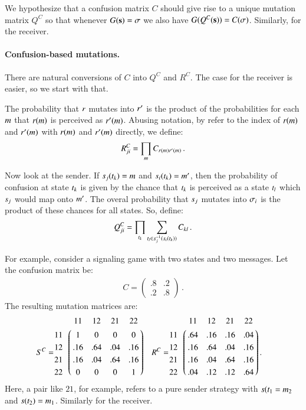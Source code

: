 \documentclass[fleqn,reqno,10pt]{article}
\renewcommand{\Smixed}{\ensuremath{\mathrm{\mathbf{s}}}}
\begin{document}
We hypothesize that a confusion matrix $C$ should give rise to a
unique mutation matrix $Q^C$ so that whenever $G(\Smixed) = \Sstrat$
we also have $G(Q^C(\Smixed)) = C(\Sstrat)$. Similarly, for the
receiver.

\paragraph{Confusion-based mutations.} There are natural conversions
of $C$ into $Q^C$ and $R^C$. The case for the receiver is easier, so
we start with that.

The probability that $r$ mutates into $r'$ is the product of
the probabilities for each $m$ that $r(m)$ is perceived
as $r'(m)$. Abusing notation, by refer to the index of
$r(m)$ and $r'(m)$ with $r(m)$ and
$r'(m)$ directly, we define:
\begin{align*}
  R^C_{ji} = \prod_{m} C_{r(m)r'(m)}\,.
\end{align*}

Now look at the sender. If $s_j(t_k)=m$ and
$s_i(t_k)=m'$, then the probability of confusion at
state $t_k$ is given by the chance that $t_k$ is perceived
as a state $t_l$ which $s_j$ would map onto $m'$. The
overal probability that $s_j$ mutates into $\sigma_i$ is the
product of these chances for all states. So, define:
\begin{align*}
  Q^C_{ji} = \prod_{t_k} \sum_{t_l \in
    s_j^{-1}(s_i(t_k))} C_{kl}\,.
\end{align*}

For example, consider a signaling game with two states and two
messages. Let the confusion matrix be:
\begin{align*}
  C=
  \begin{pmatrix}
    .8 & .2 \\
    .2 & .8 
  \end{pmatrix}\,.
\end{align*}
The resulting mutation matrices are:
\begin{align*}
S^C & = \bordermatrix{ ~ & 11 & 12 & 21 & 22 \cr
                      11 & 1 & 0 & 0 & 0 \cr
                      12 & .16 & .64 & .04 & .16 \cr
                      21 & .16 & .04 & .64 & .16 \cr
                      22 & 0 & 0 & 0 & 1 \cr}
&                    
  R^C & = \bordermatrix{ ~ & 11 & 12 & 21 & 22 \cr
                      11 & .64 & .16 & .16 & .04 \cr
                      12 & .16 & .64 & .04 & .16 \cr
                      21 & .16 & .04 & .64 & .16 \cr
                      22 & .04 & .12 & .12 & .64 \cr}\,.
\end{align*}
Here, a pair like $21$, for example, refers to a pure sender strategy
with $s(t_1=m_2$ and $s(t_2) =
m_1$. Similarly for the receiver.
\end{document}
